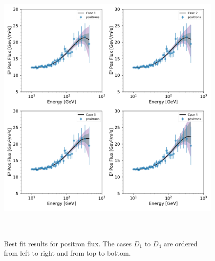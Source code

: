 \documentclass[a4paper,11pt]{article}
\begin{document}
\begin{figure}[htb]
\begin{center}
\includegraphics[height=14cm,width=14cm,angle=0]{Figures/pymultinest_fit_case_5_positron_flux.pdf}
\caption{Best fit results for positron flux. The cases $D_1$ to $D_4$ are ordered from left to right and from top to bottom.}
\label{fig:bf-positron-spectrum}
\end{center}
\end{figure}
\end{document}
